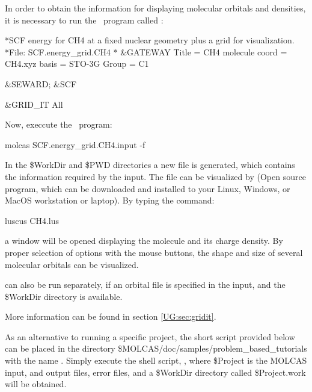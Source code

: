 In order to obtain the information for displaying molecular orbitals and densities,
it is necessary to run the \molcas\ program called :


\begin{inputlisting}
*SCF energy for CH4 at a fixed nuclear geometry plus a grid for visualization.
*File: SCF.energy_grid.CH4
*
&GATEWAY
 Title = CH4 molecule
 coord = CH4.xyz 
 basis = STO-3G 
 Group = C1

&SEWARD; &SCF                                                                                                                                                                            

&GRID_IT 
 All
\end{inputlisting}

Now, execcute the \molcas\ program:

\begin{inputlisting}
molcas SCF.energy_grid.CH4.input -f 
\end{inputlisting}

In the {\$WorkDir} and {\$PWD} directories a new file is generated,  which
contains the information required by the  input. The file can 
be visualized by  (Open source program, which can be downloaded and 
installed to your Linux, Windows, or MacOS workstation or laptop). By typing the command:

\begin{inputlisting}
luscus CH4.lus
\end{inputlisting}

a window will be opened displaying the molecule and its charge density. By proper
selection of options with the mouse buttons, the shape and size of several molecular orbitals
can be visualized.

 can also be run separately, if an orbital file is specified in
the input, and the {\$WorkDir} directory is available.

More information can be found in section \ref{UG:sec:gridit}.

As an alternative to running a specific project, the short script provided below can be placed
in the directory {\$MOLCAS/doc/samples/problem\_based\_tutorials} with the name .
Simply execute the shell script, , where {\$Project} is the {MOLCAS} input,
and output files, error files, and a {\$WorkDir} directory called {\$Project.work} will be obtained.


